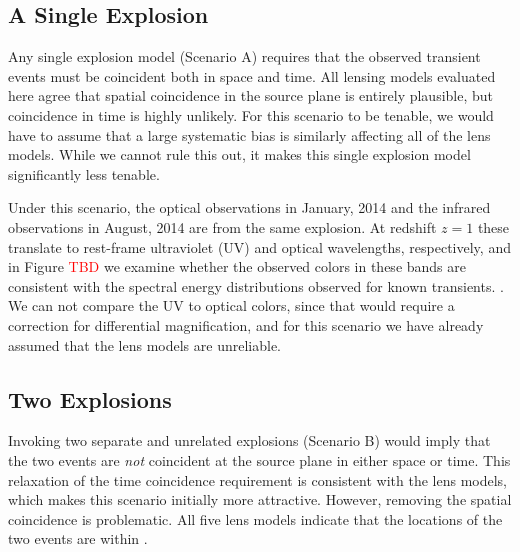 


\subsection{A Single Explosion}

Any single explosion model (Scenario A) requires that the observed
transient events must be coincident both in space and time.  All
lensing models evaluated here agree that spatial coincidence in the
source plane is entirely plausible, but coincidence in time is highly
unlikely. For this scenario to be tenable, we would have to assume
that a large systematic bias is similarly affecting all of the lens
models.  While we cannot rule this out, it makes this single explosion
model significantly less tenable. 

Under this scenario, the optical observations in January, 2014 and the
infrared observations in August, 2014 are from the same explosion. At
redshift $z=1$ these translate to rest-frame ultraviolet (UV) and
optical wavelengths, respectively, and in Figure \textcolor{red}{TBD}
we examine whether the observed colors in these bands are consistent
with the spectral energy distributions observed for known transients.
.  We can not
compare the UV to optical colors, since that would require a
correction for differential magnification, and for this scenario we
have already assumed that the lens models are unreliable. 


\subsection{Two Explosions}

Invoking two separate and unrelated explosions (Scenario B) would
imply that the two events are {\it not} coincident at the source plane
in either space or time.  This relaxation of the time coincidence
requirement is consistent with the lens models, which makes this
scenario initially more attractive.  However, removing the spatial
coincidence is problematic.  All five lens models indicate that the
locations of the two events are within .


